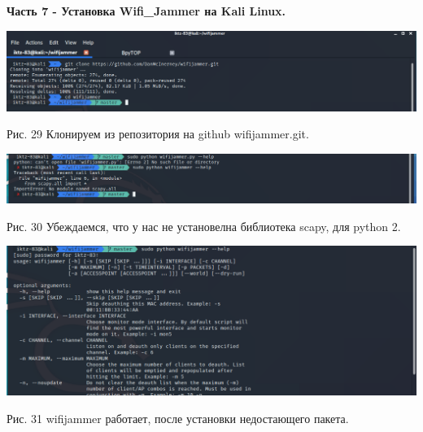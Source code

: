 \documentclass[a4paper,14pt]{extarticle}
\begin{document}
    \textbf{Часть 7 - Установка Wifi\_Jammer на Kali Linux.}
    \begin{center}
        
        \includegraphics[scale=0.4]{pics/29.png}

        Рис. 29 Клонируем из репозитория на github wifijammer.git.

        \includegraphics[scale=0.4]{pics/30.png}

        Рис. 30 Убеждаемся, что у нас не установелна библиотека scapy, для python 2.

        \includegraphics[scale=0.4]{pics/31.png}

        Рис. 31 wifijammer работает, после установки недостающего пакета.

    \end{center}
\end{document}
